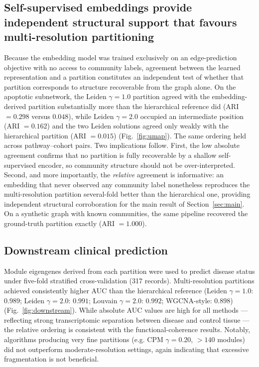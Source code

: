 \documentclass[twocolumn,11pt]{article}
\begin{document}
\subsection{Self-supervised embeddings provide independent structural support that
favours multi-resolution partitioning}

Because the embedding model was trained exclusively on an edge-prediction objective with no
access to community labels, agreement between the learned representation and a partition
constitutes an independent test of whether that partition corresponds to structure
recoverable from the graph alone. On the apoptotic subnetwork, the Leiden $\gamma=1.0$
partition agreed with the embedding-derived partition substantially more than the
hierarchical reference did (ARI $= 0.298$ versus $0.048$), while Leiden $\gamma=2.0$
occupied an intermediate position (ARI $= 0.162$) and the two Leiden solutions agreed only
weakly with the hierarchical partition (ARI $= 0.015$) (Fig.~\ref{fig:umap}). The same
ordering held across pathway--cohort pairs. Two implications follow. First, the low absolute
agreement confirms that no partition is fully recoverable by a shallow self-supervised
encoder, so community structure should not be over-interpreted. Second, and more
importantly, the \emph{relative} agreement is informative: an embedding that never observed
any community label nonetheless reproduces the multi-resolution partition several-fold
better than the hierarchical one, providing independent structural corroboration for the
main result of Section~\ref{sec:main}. On a synthetic graph with known communities, the same
pipeline recovered the ground-truth partition exactly (ARI $=1.000$).

\subsection{Downstream clinical prediction}

Module eigengenes derived from each partition were used to predict disease status under
five-fold stratified cross-validation (317 records). Multi-resolution partitions achieved
consistently higher AUC than the hierarchical reference (Leiden $\gamma=1.0$: $0.989$;
Leiden $\gamma=2.0$: $0.991$; Louvain $\gamma=2.0$: $0.992$; WGCNA-style: $0.898$)
(Fig.~\ref{fig:downstream}). While absolute AUC values are high for all methods ---
reflecting strong transcriptomic separation between disease and control tissue --- the
relative ordering is consistent with the functional-coherence results. Notably, algorithms
producing very fine partitions (e.g. CPM $\gamma=0.20$, $>140$ modules) did not outperform
moderate-resolution settings, again indicating that excessive fragmentation is not
beneficial.
\end{document}
